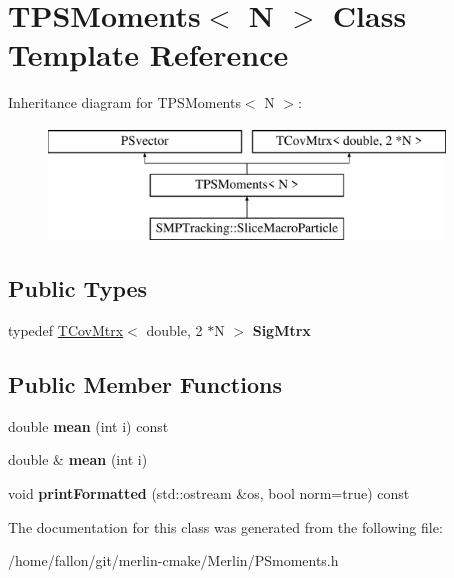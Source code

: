 \hypertarget{classTPSMoments}{}\section{T\+P\+S\+Moments$<$ N $>$ Class Template Reference}
\label{classTPSMoments}
Inheritance diagram for T\+P\+S\+Moments$<$ N $>$\+:\begin{figure}[H]
\begin{center}
\leavevmode
\includegraphics[height=3.000000cm]{classTPSMoments}
\end{center}
\end{figure}
\subsection*{Public Types}
\begin{DoxyCompactItemize}
\item 
\mbox{\label{classTPSMoments_a334337843c2888b187e34d070bd03d25}} 
typedef \hyperlink{classTCovMtrx}{T\+Cov\+Mtrx}$<$ double, 2 $\ast$N $>$ {\bfseries Sig\+Mtrx}
\end{DoxyCompactItemize}
\subsection*{Public Member Functions}
\begin{DoxyCompactItemize}
\item 
\mbox{\label{classTPSMoments_aacc7f79caaff9281ed9eaee6aa0d9f18}} 
double {\bfseries mean} (int i) const
\item 
\mbox{\label{classTPSMoments_a93de0055f5c212c6102f5dee472d2eef}} 
double \& {\bfseries mean} (int i)
\item 
\mbox{\label{classTPSMoments_a16786a57e7c857e7bbe03b587a3f8815}} 
void {\bfseries print\+Formatted} (std\+::ostream \&os, bool norm=true) const
\end{DoxyCompactItemize}


The documentation for this class was generated from the following file\+:\begin{DoxyCompactItemize}
\item 
/home/fallon/git/merlin-\/cmake/\+Merlin/P\+Smoments.\+h\end{DoxyCompactItemize}
